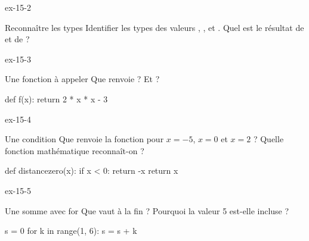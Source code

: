 \begin{blocLivre}{ex-15-2}
\begin{exercice}[1]{Reconnaître les types}
Identifier les types des valeurs , ,  et . Quel est le résultat de  et de  ?
\end{exercice}
\end{blocLivre}
\begin{blocLivre}{ex-15-3}
\begin{exercice}[1]{Une fonction à appeler}
Que renvoie  ? Et  ?
\begin{python}
def f(x):
    return 2 * x * x - 3
\end{python}
\end{exercice}
\end{blocLivre}
\begin{blocLivre}{ex-15-4}
\begin{exercice}[1]{Une condition}
Que renvoie la fonction pour $x=-5$, $x=0$ et $x=2$ ? Quelle fonction mathématique reconnaît-on ?
\begin{python}
def distancezero(x):
    if x < 0:
        return -x
    return x
\end{python}
\end{exercice}
\end{blocLivre}
\begin{blocLivre}{ex-15-5}
\begin{exercice}[1]{Une somme avec for}
Que vaut  à la fin ? Pourquoi la valeur 5 est-elle incluse ?
\begin{python}
s = 0
for k in range(1, 6):
    s = s + k
\end{python}
\end{exercice}
\end{blocLivre}

